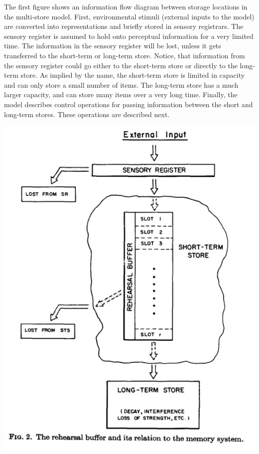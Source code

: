 \documentclass[
  oneside,
  12pt]{crumpbook}
\newenvironment{floatright50}{%
  \wrapfigure{R}{.5\textwidth}%
  }{%
  \endwrapfigure}
\begin{document}
The first figure shows an information flow diagram between storage locations in the multi-store model. First, environmental stimuli (external inputs to the model) are converted into representations and briefly stored in sensory registrars. The sensory register is assumed to hold onto perceptual information for a very limited time. The information in the sensory register will be lost, unless it gets transferred to the short-term or long-term store. Notice, that information from the sensory register could go either to the short-term store or directly to the long-term store. As implied by the name, the short-term store is limited in capacity and can only store a small number of items. The long-term store has a much larger capacity, and can store many items over a very long time. Finally, the model describes control operations for passing information between the short and long-term stores. These operations are described next.

\begin{floatright50}
\includegraphics[width=1\linewidth]{imgs/Multi_store_2}

\end{floatright50}
\end{document}
